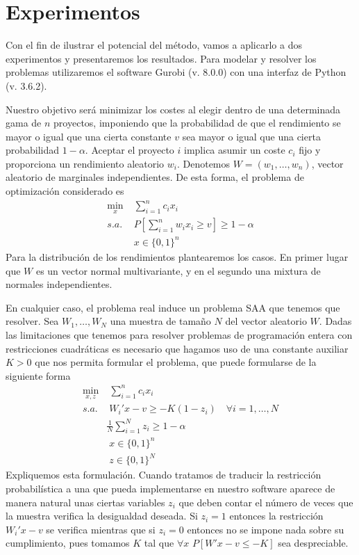 \documentclass[twoside,a4paper,openright,12pt]{book}
\begin{document}
%
\chapter{Experimentos}
Con el fin de ilustrar el potencial del método, vamos a aplicarlo a dos experimentos y presentaremos los resultados. Para modelar y resolver los problemas utilizaremos el software Gurobi (v. 8.0.0) con una interfaz de Python (v. 3.6.2).

Nuestro objetivo será minimizar los costes al elegir dentro de una determinada gama de $n$ proyectos, imponiendo que la probabilidad de que el rendimiento se mayor o igual que una cierta constante $v$ sea mayor o igual que una cierta probabilidad $1-\alpha$. Aceptar el proyecto $i$ implica asumir un coste $c_i$ fijo y proporciona un rendimiento aleatorio $w_i$. Denotemos $W=(w_1,\dotsc,w_n)$, vector aleatorio de marginales independientes. De esta forma, el problema de optimización considerado es
\begin{align*}
\min_{x}&\;\sum_{i=1}^n c_i x_i\\
s.a.&\; P\left[\sum_{i=1}^n w_i x_i \geq v\right]\geq 1-\alpha\\
&\; x \in \{0,1\}^n
\end{align*}
Para la distribución de los rendimientos plantearemos los casos. En primer lugar que $W$ es un vector normal multivariante, y en el segundo una mixtura de normales independientes.

En cualquier caso, el problema real induce un problema SAA que tenemos que resolver. Sea $W_1,\dotsc,W_N$ una muestra de tamaño $N$ del vector aleatorio $W$. Dadas las limitaciones que tenemos para resolver problemas de programación entera con restricciones cuadráticas es necesario que hagamos uso de una constante auxiliar $K>0$ que nos permita formular el problema, que puede formularse de la siguiente forma 
\begin{align*}
\min_{x,z}&\;\sum_{i=1}^n c_i x_i\\
s.a.&\; W_i'x-v\geq - K(1-z_i) \quad \forall i =1,\dotsc,N\\
& \frac{1}{N}\sum_{i=1}^Nz_i \geq 1-\alpha \\
&\; x \in \{0,1\}^n\\
&\; z\in \{0,1\}^N
\end{align*}
Expliquemos esta formulación. Cuando tratamos de traducir la restricción probabilística a una que pueda implementarse en nuestro software aparece de manera natural unas ciertas variables $z_i$ que deben contar el número de veces que la muestra verifica la desigualdad deseada. Si $z_i=1$ entonces la restricción $W_i'x - v$ se verifica mientras que si $z_i=0$ entonces no se impone nada sobre su cumplimiento, pues tomamos $K$ tal que $\forall x$ $P[W'x-v\leq -K]$ sea despreciable.
\end{document}
